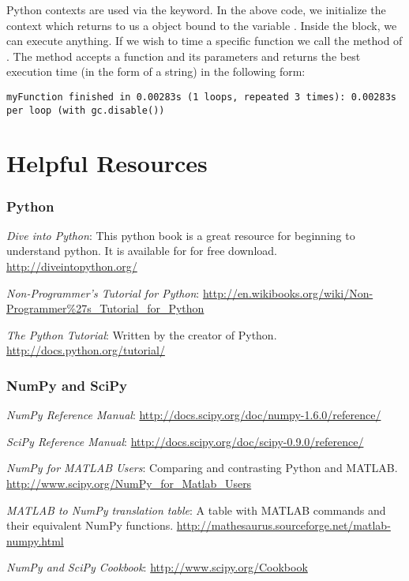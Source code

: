 Python contexts are used via the  keyword.  In the above code, we initialize the  context which returns to us a  object bound to the variable .  Inside the block, we can execute anything.  If we wish to time a specific function we call the  method of .  The  method accepts a function and its parameters and returns the best execution time (in the form of a string) in the following form:
\begin{lstlisting}
myFunction finished in 0.00283s (1 loops, repeated 3 times): 0.00283s per loop (with gc.disable())
\end{lstlisting}

\section*{Helpful Resources}
\subsubsection*{Python}
\noindent \emph{Dive into Python}:  This python book is a great resource for beginning to understand python.  It is available for for free download. \url{http://diveintopython.org/}

\noindent \emph{Non-Programmer's Tutorial for Python}: \url{http://en.wikibooks.org/wiki/Non-Programmer\%27s_Tutorial_for_Python}

\noindent \emph{The Python Tutorial}: Written by the creator of Python. \url{http://docs.python.org/tutorial/}

\subsubsection*{NumPy and SciPy}
\noindent \emph{NumPy Reference Manual}: \url{http://docs.scipy.org/doc/numpy-1.6.0/reference/}

\noindent \emph{SciPy Reference Manual}: \url{http://docs.scipy.org/doc/scipy-0.9.0/reference/}

\noindent \emph{NumPy for MATLAB Users}: Comparing and contrasting Python and MATLAB. \url{http://www.scipy.org/NumPy_for_Matlab_Users}

\noindent \emph{MATLAB to NumPy translation table}: A table with MATLAB commands and their equivalent NumPy functions.   \url{http://mathesaurus.sourceforge.net/matlab-numpy.html}

\noindent \emph{NumPy and SciPy Cookbook}: \url{http://www.scipy.org/Cookbook}

